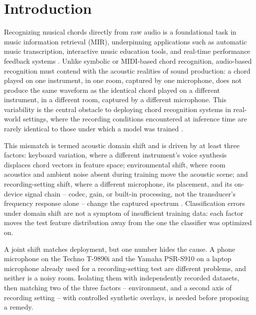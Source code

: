 \documentclass[pdflatex,sn-mathphys-num,iicol]{sn-jnl}
\theoremstyle{thmstyleone}
\theoremstyle{thmstyletwo}
\theoremstyle{thmstylethree}
\begin{document}
\maketitle

\section{Introduction}\label{sec1}

Recognizing musical chords directly from raw audio is a foundational task in music information retrieval (MIR), underpinning applications such as automatic music transcription, interactive music education tools, and real-time performance feedback systems \cite{Telila2023}\cite{Saputra2021}\cite{Moysis2023}. Unlike symbolic or MIDI-based chord recognition, audio-based recognition must contend with the acoustic realities of sound production: a chord played on one instrument, in one room, captured by one microphone, does not produce the same waveform as the identical chord played on a different instrument, in a different room, captured by a different microphone. This variability is the central obstacle to deploying chord recognition systems in real-world settings, where the recording conditions encountered at inference time are rarely identical to those under which a model was trained \cite{Kusaka2024}.

This mismatch is termed acoustic domain shift and is driven by at least three factors: keyboard variation, where a different instrument's voice synthesis displaces chord vectors in feature space; environmental shift, where room acoustics and ambient noise absent during training move the acoustic scene; and recording-setting shift, where a different microphone, its placement, and its on-device signal chain -- codec, gain, or built-in processing, not the transducer's frequency response alone -- change the captured spectrum \cite{Kusaka2024}\cite{Majchrzak2025}. Classification errors under domain shift are not a symptom of insufficient training data: each factor moves the test feature distribution away from the one the classifier was optimized on.

A joint shift matches deployment, but one number hides the cause. A phone microphone on the Techno T-9890i and the Yamaha PSR-S910 on a laptop microphone already used for a recording-setting test are different problems, and neither is a noisy room. Isolating them with independently recorded datasets, then matching two of the three factors -- environment, and a second axis of recording setting -- with controlled synthetic overlays, is needed before proposing a remedy.
\end{document}
